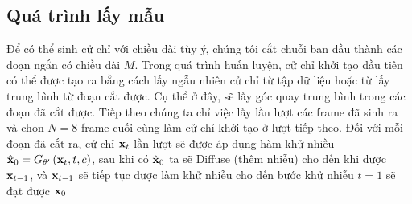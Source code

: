 %
%
%	


\subsection{Quá trình lấy mẫu}

Để có thể sinh cử chỉ với chiều dài tùy ý, chúng tôi cắt chuỗi ban đầu thành các đoạn ngắn có chiều dài $M$. Trong quá trình huấn luyện, cử chỉ khởi tạo đầu tiên có thể được tạo ra bằng cách lấy ngẫu nhiên cử chỉ từ tập dữ liệu hoặc từ lấy trung bình từ đoạn cắt được. Cụ thể ở đây, sẽ lấy góc quay trung bình trong các đoạn đã cắt được. Tiếp theo chúng ta chỉ việc lấy lần lượt các frame đã sinh ra và chọn $N = 8$ frame cuối cùng làm cử chỉ khởi tạo ở lượt tiếp theo. Đối với mỗi đoạn đã cắt ra, cử chỉ $\mathbf{x}_{t}$ lần lượt sẽ được áp dụng hàm khử nhiều $\hat{\mathbf{x}}_{0} = G_{\theta'} \left( \mathbf{x}_{t}, t, c\right)$, sau khi có $\hat{\mathbf{x}}_{0}$ ta sẽ Diffuse (thêm nhiễu) cho đến khi được  $\mathbf{x}_{t-1}$, và $\mathbf{x}_{t-1}$ sẽ tiếp tục được làm khử nhiễu cho đến bước khử nhiễu $t=1$ sẽ đạt được $\mathbf{x}_{0}$ 

